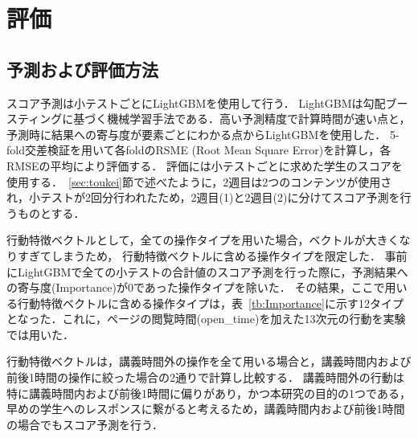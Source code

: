 \documentclass[a4paper,12pt]{ltjsreport}
\begin{document}


\chapter{評価}

\section{予測および評価方法}\label{sec:yosoku}

スコア予測は小テストごとにLightGBMを使用して行う．
LightGBMは勾配ブースティングに基づく機械学習手法である．高い予測精度で計算時間が速い点と，予測時に結果への寄与度が要素ごとにわかる点からLightGBMを使用した．
5-fold交差検証を用いて各foldのRSME (Root Mean Square Error)を計算し，各RMSEの平均により評価する．
評価には小テストごとに求めた学生のスコアを使用する．~\ref{sec:toukei}節で述べたように，2週目は2つのコンテンツが使用され，小テストが2回分行われたため，2週目(1)と2週目(2)に分けてスコア予測を行うものとする．

行動特徴ベクトルとして，全ての操作タイプを用いた場合，ベクトルが大きくなりすぎてしまうため，
行動特徴ベクトルに含める操作タイプを限定した．
事前にLightGBMで全ての小テストの合計値のスコア予測を行った際に，予測結果への寄与度(Importance)が0であった操作タイプを除いた．
その結果，ここで用いる行動特徴ベクトルに含める操作タイプは，表~\ref{tb:Importance}に示す12タイプとなった．これに，ページの閲覧時間(open\_time)を加えた13次元の行動を実験では用いた．


行動特徴ベクトルは，講義時間外の操作を全て用いる場合と，講義時間内および前後1時間の操作に絞った場合の2通りで計算し比較する．
講義時間外の行動は特に講義時間内および前後1時間に偏りがあり，かつ本研究の目的の1つである，早めの学生へのレスポンスに繋がると考えるため，講義時間内および前後1時間の場合でもスコア予測を行う．

\end{document}
